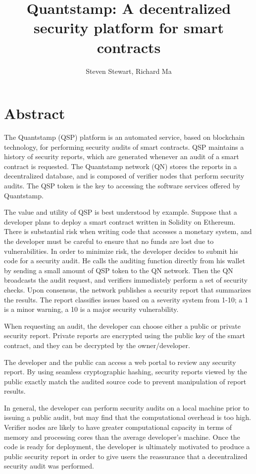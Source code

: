\documentclass{llncs}
\begin{document}
\title{Quantstamp: A decentralized security platform for smart contracts}
\author{Steven Stewart, Richard Ma}
\maketitle

\section{Abstract}
The Quantstamp (QSP) platform is an automated service, based on blockchain technology, for performing security audits of smart contracts. QSP maintains a history of security reports, which are generated whenever an audit of a smart contract is requested. The Quantstamp network (QN) stores the reports in a decentralized database, and is composed of verifier nodes that perform security audits. The QSP token is the key to accessing the software services offered by Quantstamp.

The value and utility of QSP is best understood by example. Suppose that a developer plans to deploy a smart contract written in Solidity on Ethereum. There is substantial risk when writing code that accesses a monetary system, and the developer must be careful to ensure that no funds are lost due to vulnerabilities. In order to minimize risk, the developer decides to submit his code for a security audit. He calls the auditing function directly from his wallet by sending a small amount of QSP token to the QN network. Then the QN broadcasts the audit request, and verifiers immediately perform a set of security checks. Upon consensus, the network publishes a security report that summarizes the results. The report classifies issues based on a severity system from 1-10; a 1 is a minor warning, a 10 is a major security vulnerability. 

When requesting an audit, the developer can choose either a public or private security report. Private reports are encrypted using the public key of the smart contract, and they can be decrypted by the owner/developer.

The developer and the public can access a web portal to review any security report. By using seamless cryptographic hashing, security reports viewed by the public exactly match the audited source code to prevent manipulation of report results. 

In general, the developer can perform security audits on a local machine prior to issuing a public audit, but may find that the computational overhead is too high. Verifier nodes are likely to have greater computational capacity in terms of memory and processing cores than the average developer's machine. Once the code is ready for deployment, the developer is ultimately motivated to produce a public security report in order to give users the reassurance that a decentralized security audit was performed.
\end{document}
